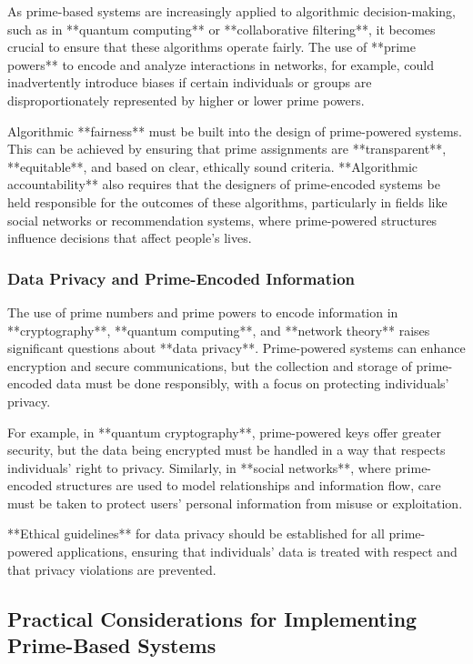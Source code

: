 \documentclass[12pt]{article}
\begin{document}
As prime-based systems are increasingly applied to algorithmic decision-making, such as in **quantum computing** or **collaborative filtering**, it becomes crucial to ensure that these algorithms operate fairly. The use of **prime powers** to encode and analyze interactions in networks, for example, could inadvertently introduce biases if certain individuals or groups are disproportionately represented by higher or lower prime powers.

Algorithmic **fairness** must be built into the design of prime-powered systems. This can be achieved by ensuring that prime assignments are **transparent**, **equitable**, and based on clear, ethically sound criteria. **Algorithmic accountability** also requires that the designers of prime-encoded systems be held responsible for the outcomes of these algorithms, particularly in fields like social networks or recommendation systems, where prime-powered structures influence decisions that affect people’s lives.

\subsubsection{Data Privacy and Prime-Encoded Information}

The use of prime numbers and prime powers to encode information in **cryptography**, **quantum computing**, and **network theory** raises significant questions about **data privacy**. Prime-powered systems can enhance encryption and secure communications, but the collection and storage of prime-encoded data must be done responsibly, with a focus on protecting individuals' privacy.

For example, in **quantum cryptography**, prime-powered keys offer greater security, but the data being encrypted must be handled in a way that respects individuals' right to privacy. Similarly, in **social networks**, where prime-encoded structures are used to model relationships and information flow, care must be taken to protect users' personal information from misuse or exploitation.

**Ethical guidelines** for data privacy should be established for all prime-powered applications, ensuring that individuals' data is treated with respect and that privacy violations are prevented.

\subsection{Practical Considerations for Implementing Prime-Based Systems}
\end{document}
